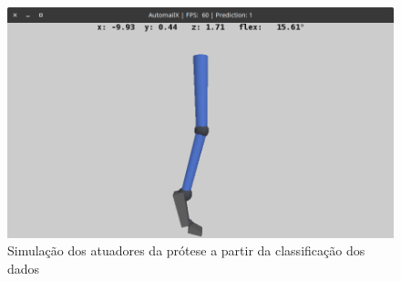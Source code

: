 \begin{figure}[ht]
	\caption{\label{fig:result_simulacao_atuadores}Simulação dos atuadores da prótese a partir da classificação dos dados}
	\begin{center}
	    \includegraphics[width=.8\textwidth]{resources/result_simulacao_atuadores}
	\end{center}
\end{figure}

